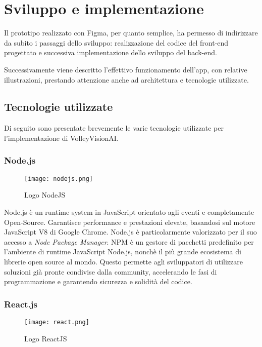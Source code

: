\chapter{Sviluppo e implementazione}
\label{cha:sviluppo_implementazione}

Il prototipo realizzato con Figma, per quanto semplice, ha permesso di indirizzare da subito i passaggi dello sviluppo: realizzazione del codice del front-end progettato e successiva implementazione dello sviluppo del back-end.

Successivamente viene descritto l'effettivo funzionamento dell'app, con relative illustrazioni, prestando attenzione anche ad architettura e tecnologie utilizzate.

\section{Tecnologie utilizzate}
\label{sec:tecnologie}

Di seguito sono presentate brevemente le varie tecnologie utilizzate per l'implementazione di VolleyVisionAI.


\subsection{Node.js}
\begin{wrapfigure}{r}{0.33\textwidth}
    \centering
    \texttt{[image: nodejs.png]}
    \caption{Logo NodeJS}
\end{wrapfigure}
    
Node.js è un runtime system in JavaScript orientato agli eventi e completamente Open-Source. Garantisce performance e prestazioni elevate, basandosi sul motore JavaScript V8 di Google Chrome. Node.js è particolarmente valorizzato per il suo accesso a \textit{Node Package Manager}. NPM è un gestore di pacchetti predefinito per l'ambiente di runtime JavaScript Node.js, nonchè il più grande ecosistema di librerie open source al mondo. Questo permette agli sviluppatori di utilizzare soluzioni già pronte condivise dalla community, accelerando le fasi di programmazione e garantendo sicurezza e solidità del codice.


\subsection{React.js}
\begin{wrapfigure}{r}{0.33\textwidth}
    \centering
    \vspace{-15px}
    \texttt{[image: react.png]}
    \caption{Logo ReactJS}
\end{wrapfigure}
    
